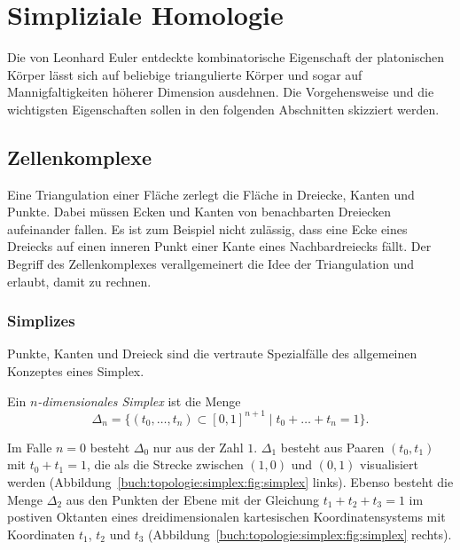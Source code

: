 %
%
\section{Simpliziale Homologie
\label{buch:topologie:section:simplex}}
%
Die von Leonhard Euler entdeckte kombinatorische Eigenschaft der platonischen
%
Körper lässt sich auf beliebige triangulierte Körper und sogar
%
auf Mannigfaltigkeiten höherer Dimension ausdehnen.
Die Vorgehensweise und die wichtigsten Eigenschaften sollen in den
folgenden Abschnitten skizziert werden.

%
%
\subsection{Zellenkomplexe}
Eine Triangulation einer Fläche zerlegt die Fläche in Dreiecke,
Kanten und Punkte.
%
Dabei müssen Ecken und Kanten von benachbarten Dreiecken aufeinander
fallen.
Es ist zum Beispiel nicht zulässig, dass eine Ecke eines Dreiecks
auf einen inneren Punkt einer Kante eines Nachbardreiecks fällt.
Der Begriff des Zellenkomplexes verallgemeinert die Idee
der Triangulation und erlaubt, damit zu rechnen.
%
%

%
%
\subsubsection{Simplizes}
Punkte, Kanten und Dreieck sind die vertraute Spezialfälle des allgemeinen
%
%
%
Konzeptes eines Simplex.
%

\begin{definition}[Simplex]
%
Ein \emph{$n$-dimensionales Simplex} ist die Menge
%
%
\[
\Delta_n
=
\{
(t_0,\dots,t_n)
\subset
[0,1]^{n+1}
\mid
t_0+\dots+t_n=1
\}.
\]
%
\end{definition}

Im Falle $n=0$ besteht $\Delta_0$ nur aus der Zahl $1$.
$\Delta_1$ besteht aus Paaren $(t_0,t_1)$ mit $t_0+t_1=1$, die
als die Strecke zwischen $(1,0)$ und $(0,1)$ visualisiert
werden (Abbildung~\ref{buch:topologie:simplex:fig:simplex} links).
Ebenso besteht die Menge $\Delta_2$ aus den Punkten der Ebene mit
der Gleichung $t_1+t_2+t_3=1$ im postiven Oktanten eines
dreidimensionalen kartesischen Koordinatensystems mit Koordinaten
$t_1$, $t_2$ und $t_3$
(Abbildung~\ref{buch:topologie:simplex:fig:simplex} rechts).

